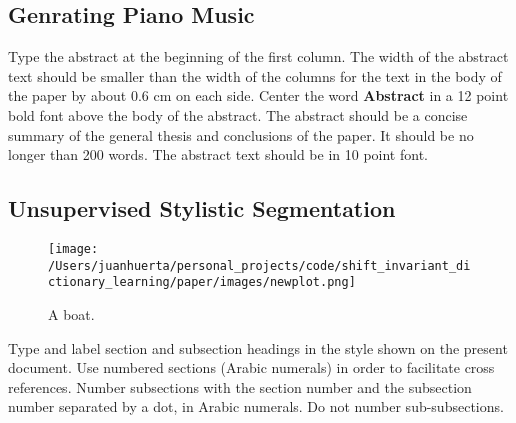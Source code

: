\documentclass[11pt,a4paper]{article}
\begin{document}


\subsection{Genrating Piano Music }

Type the abstract at the beginning of the first
column. The width of the abstract text should be smaller than the
width of the columns for the text in the body of the paper by about
0.6 cm on each side. Center the word \textbf{Abstract} in a 12 point bold
font above the body of the abstract. The abstract should be a concise
summary of the general thesis and conclusions of the paper. It should
be no longer than 200 words. The abstract text should be in 10 point font.



\subsection{Unsupervised Stylistic Segmentation }

\begin{figure*}[ht]
  \texttt{[image: /Users/juanhuerta/personal\_projects/code/shift\_invariant\_dictionary\_learning/paper/images/newplot.png]}
  \caption{A boat.}
  \label{fig:boat1}
\end{figure*}

Type and label section and subsection headings in the
style shown on the present document.  Use numbered sections (Arabic
numerals) in order to facilitate cross references. Number subsections
with the section number and the subsection number separated by a dot,
in Arabic numerals.
Do not number sub-subsections.
\end{document}
